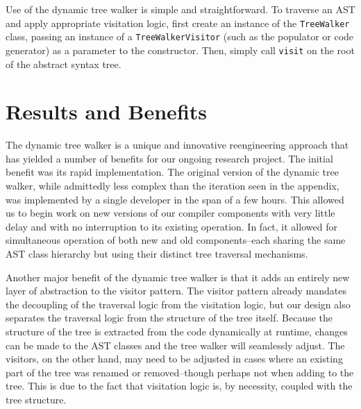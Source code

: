 \documentclass[times]{speauth}
\begin{document}
Use of the dynamic tree walker is simple and straightforward. To traverse an AST and apply appropriate visitation logic, first create an instance of the \texttt{TreeWalker} class, passing an instance of a \texttt{TreeWalkerVisitor} (such as the populator or code generator) as a parameter to the constructor. Then, simply call \texttt{visit} on the root of the abstract syntax tree.


\section{Results and Benefits}

The dynamic tree walker is a unique and innovative reengineering approach that has yielded a number of benefits for our ongoing research project. The initial benefit was its rapid implementation. The original version of the dynamic tree walker, while admittedly less complex than the iteration seen in the appendix, was implemented by a single developer in the span of a few hours. This allowed us to begin work on new versions of our compiler components with very little delay and with no interruption to its existing operation. In fact, it allowed for simultaneous operation of both new and old components--each sharing the same AST class hierarchy but using their distinct tree traversal mechanisms.

Another major benefit of the dynamic tree walker is that it adds an entirely new layer of abstraction to the visitor pattern. The visitor pattern already mandates the decoupling of the traversal logic from the visitation logic, but our design also separates the traversal logic from the structure of the tree itself. Because the structure of the tree is extracted from the code dynamically at runtime, changes can be made to the AST classes and the tree walker will seamlessly adjust. The visitors, on the other hand, may need to be adjusted in cases where an existing part of the tree was renamed or removed--though perhaps not when adding to the tree. This is due to the fact that visitation logic is, by necessity, coupled with the tree structure.
\end{document}
